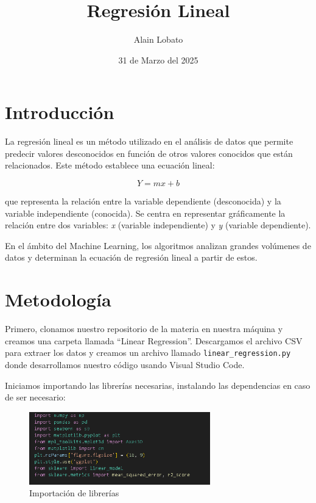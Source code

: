 \documentclass{article}
\title{Regresi\'on Lineal}
\author{Alain Lobato}
\date{31 de Marzo del 2025}
\begin{document}
\maketitle

\section{Introducci\'on}

La regresi\'on lineal es un m\'etodo utilizado en el an\'alisis de datos que permite predecir valores desconocidos en funci\'on de otros valores conocidos que est\'an relacionados. 
Este m\'etodo establece una ecuaci\'on lineal:

\begin{equation}
Y = mx + b
\end{equation}

que representa la relaci\'on entre la variable dependiente (desconocida) y la variable independiente (conocida). Se centra en representar gr\'aficamente la relaci\'on entre dos variables: \textit{x} (variable independiente) y \textit{y} (variable dependiente). 

En el \'ambito del Machine Learning, los algoritmos analizan grandes vol\'umenes de datos y determinan la ecuaci\'on de regresi\'on lineal a partir de estos.

\section{Metodolog\'ia}

Primero, clonamos nuestro repositorio de la materia en nuestra m\'aquina y creamos una carpeta llamada ``Linear Regression''. Descargamos el archivo CSV para extraer los datos y creamos un archivo llamado \texttt{linear\_regression.py} donde desarrollamos nuestro c\'odigo usando Visual Studio Code.

Iniciamos importando las librer\'ias necesarias, instalando las dependencias en caso de ser necesario:

\begin{figure}[H]
    \centering
    \includegraphics[width=0.7\textwidth]{img/1.png}
    \caption{Importaci\'on de librer\'ias}
\end{figure}
\end{document}
